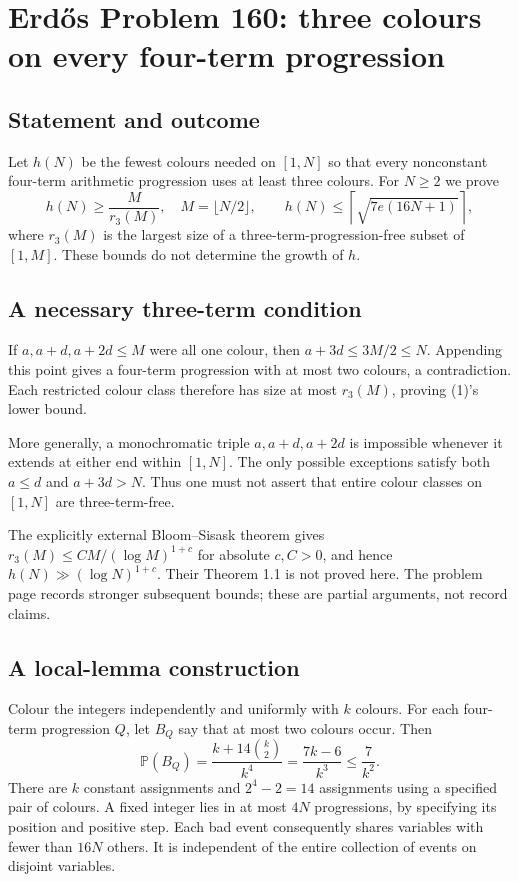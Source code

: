 \section*{Erd\H{o}s Problem 160: three colours on every four-term progression}
\subsection*{Statement and outcome}
Let $h(N)$ be the fewest colours needed on $[1,N]$ so that every nonconstant four-term arithmetic progression uses at least three colours. For $N\ge2$ we prove
\[
 h(N)\ge\frac{M}{r_3(M)},\quad M=\lfloor N/2\rfloor,
 \qquad h(N)\le\left\lceil\sqrt{7e(16N+1)}\right\rceil,
 \tag{1}
\]
where $r_3(M)$ is the largest size of a three-term-progression-free subset of $[1,M]$. These bounds do not determine the growth of $h$.

\subsection*{A necessary three-term condition}
If $a,a+d,a+2d\le M$ were all one colour, then
$a+3d\le3M/2\le N$. Appending this point gives a four-term progression with at most two colours, a contradiction. Each restricted colour class therefore has size at most $r_3(M)$, proving (1)'s lower bound.

More generally, a monochromatic triple $a,a+d,a+2d$ is impossible whenever it extends at either end within $[1,N]$. The only possible exceptions satisfy both $a\le d$ and $a+3d>N$. Thus one must not assert that entire colour classes on $[1,N]$ are three-term-free.

The explicitly external Bloom--Sisask theorem gives $r_3(M)\le CM/(\log M)^{1+c}$ for absolute $c,C>0$, and hence $h(N)\gg(\log N)^{1+c}$. Their Theorem 1.1 is not proved here. The problem page records stronger subsequent bounds; these are partial arguments, not record claims.

\subsection*{A local-lemma construction}
Colour the integers independently and uniformly with $k$ colours. For each four-term progression $Q$, let $B_Q$ say that at most two colours occur. Then
\[
 \mathbb P(B_Q)=\frac{k+14\binom k2}{k^4}
              =\frac{7k-6}{k^3}\le\frac7{k^2}.
\]
There are $k$ constant assignments and $2^4-2=14$ assignments using a specified pair of colours.
A fixed integer lies in at most $4N$ progressions, by specifying its position and positive step. Each bad event consequently shares variables with fewer than $16N$ others. It is independent of the entire collection of events on disjoint variables.

